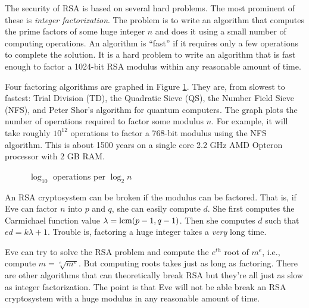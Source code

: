 

The security of RSA is based on several hard problems.
The most prominent of these is \emph{integer factorization}.
The problem is to write an algorithm that computes the prime factors of some huge integer $n$
and does it using a small number of computing operations.
An algorithm is ``fast'' if it requires only a few operations to complete the solution.
It is a hard problem to write an algorithm that is fast enough 
to factor a 1024-bit RSA modulus within any reasonable amount of time.

Four factoring algorithms are graphed in Figure \ref{factor-ops}.
They are, from slowest to fastest: Trial Division (TD), the Quadratic Sieve (QS),
the Number Field Sieve (NFS), and Peter Shor's algorithm for quantum computers.\cite{Shor}
The graph plots the number of operations required to factor some modulus $n$.
For example, it will take roughly $10^{12}$ operations 
to factor a 768-bit modulus using the NFS algorithm.
This is about 1500 years on a single core 2.2 GHz AMD Opteron processor with 2 GB RAM.\cite{RSA-768}


\begin{figure}[h]
\vspace{4ex}
\begin{center}

\vspace{2ex}
\caption{$\log_{10}$ operations per $\log_2 n$}
\label{factor-ops}
\end{center}
\end{figure}

An RSA cryptosystem can be broken if the modulus can be factored.
That is, if Eve can factor $n$ into $p$ and $q$, she can easily compute $d$.
She first computes the Carmichael function value $\lambda=\mathrm{lcm}(p-1,q-1)$.
Then she computes $d$ such that $ed=k\lambda + 1$.
Trouble is, factoring a huge integer takes a \emph{very} long time.

Eve can try to solve the RSA problem\cite{RSA-problem} and 
compute the $e^{th}$ root of $m^e$,
i.e., compute $m = \sqrt[e]{m^e}$.
But computing roots takes just as long as factoring.
There are other algorithms that can theoretically break RSA
but they're all just as slow as integer factorization.
The point is that Eve will not be able break an RSA cryptosystem with a huge modulus 
in any reasonable amount of time.

